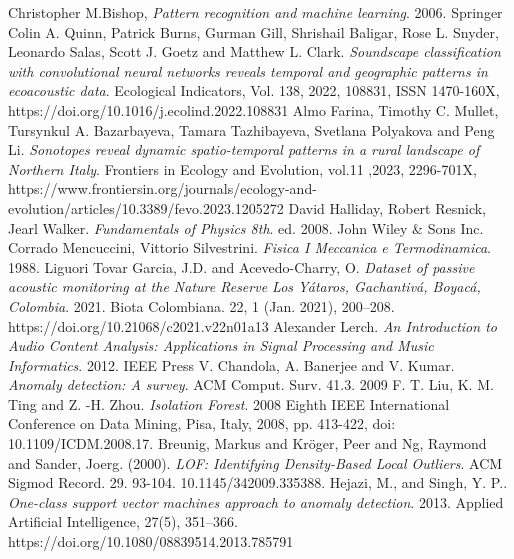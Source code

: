 
\cleardoublepage
{}

\begin{thebibliography}{99}
	\small
	 Christopher M.Bishop, \emph{Pattern recognition and machine learning}. 2006. Springer
	 Colin A. Quinn, Patrick Burns, Gurman Gill, Shrishail Baligar, Rose L. Snyder, Leonardo Salas, Scott J.
	Goetz and Matthew L. Clark. \emph{Soundscape classification with convolutional neural networks reveals temporal
	and geographic patterns in ecoacoustic data}. Ecological Indicators, Vol. 138, 2022, 108831, ISSN 1470-160X,
	https://doi.org/10.1016/j.ecolind.2022.108831
	 Almo Farina, Timothy C. Mullet, Tursynkul A. Bazarbayeva, Tamara Tazhibayeva, Svetlana Polyakova and
	Peng Li. \emph{Sonotopes reveal dynamic spatio-temporal patterns in a rural landscape of Northern Italy}. Frontiers in
	Ecology and Evolution, vol.11 ,2023, 2296-701X,
	https://www.frontiersin.org/journals/ecology-and-evolution/articles/10.3389/fevo.2023.1205272
	 David Halliday, Robert Resnick, Jearl Walker. \emph{Fundamentals of Physics 8th}. ed. 2008. John Wiley \& Sons Inc.
	 Corrado Mencuccini, Vittorio Silvestrini. \emph{Fisica I Meccanica e Termodinamica}. 1988. Liguori
	 Tovar Garcia, J.D. and Acevedo-Charry, O. \emph{Dataset of passive acoustic monitoring at the Nature Reserve	Los Yátaros, Gachantivá, Boyacá, Colombia}. 2021. Biota Colombiana. 22, 1 (Jan. 2021), 200–208.
	https://doi.org/10.21068/c2021.v22n01a13
	 Alexander Lerch. \emph{An Introduction to Audio Content Analysis: Applications in Signal Processing and Music Informatics}. 2012. IEEE Press
	 V. Chandola, A. Banerjee and V. Kumar. \emph{Anomaly detection: A survey}. ACM Comput. Surv. 41.3. 2009
	 F. T. Liu, K. M. Ting and Z. -H. Zhou. \emph{Isolation Forest}. 2008 Eighth IEEE International Conference on Data Mining, Pisa, Italy, 2008, pp. 413-422, doi: 10.1109/ICDM.2008.17.
	 Breunig, Markus and Kröger, Peer and Ng, Raymond and Sander, Joerg. (2000). \emph{LOF: Identifying Density-Based Local Outliers}. ACM Sigmod Record. 29. 93-104. 10.1145/342009.335388.
	 Hejazi, M., and Singh, Y. P.. \emph{One-class support vector machines approach to anomaly detection}.
	2013. Applied Artificial Intelligence, 27(5), 351–366. https://doi.org/10.1080/08839514.2013.785791
\end{thebibliography}
